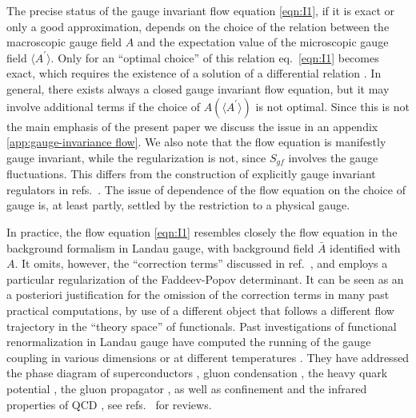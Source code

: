 \documentclass[twocolumn,aps,prd,amsmath,amssymb,preprintnumbers,longbibliography]{revtex4-1}
\numberwithin{equation}{section}
\begin{document}
The precise status of the gauge invariant flow equation \eqref{eqn:I1}, if it is exact or only a good approximation, depends on the choice of the relation between the macroscopic gauge field $A$ and the expectation value of the microscopic gauge field $\langle A^{\prime}\rangle$. Only for an ``optimal choice'' of this relation eq.~\eqref{eqn:I1} becomes exact, which requires the existence of a solution of a differential relation \cite{CWGIF}. In general, there exists always a closed gauge invariant flow equation, but it may involve additional terms if the choice of $A(\langle A^{\prime}\rangle )$ is not optimal. Since this is not the main emphasis of the present paper we discuss the issue in an appendix \ref{app:gauge-invariance flow}. We also note that the flow equation is manifestly gauge invariant, while the regularization is not, since $S_{gf}$ involves the gauge fluctuations. This differs from the construction of explicitly gauge invariant regulators in refs.~\cite{MOR1,MOR2,MOR2}. The issue of dependence of the flow equation on the choice of gauge \cite{LAV} is, at least partly, settled by the restriction to a physical gauge.

In practice, the flow equation \eqref{eqn:I1} resembles closely the flow equation in the background formalism \cite{RW} in Landau gauge, with background field $\bar{A}$ identified with $A$. It omits, however, the ``correction terms'' discussed in ref.~\cite{RW}, and employs a particular regularization of the Faddeev-Popov determinant. It can be seen as an a posteriori justification for the omission of the correction terms in many past practical computations, by use of a different object that follows a different flow trajectory in the ``theory space'' of functionals. Past investigations of functional renormalization in Landau gauge \cite{RW,R2,R3,R4} have computed the running of the gauge coupling in various dimensions \cite{RW,R3,R11,R12,R13} or at different temperatures \cite{RW,R14}. They have addressed the phase diagram of superconductors \cite{R6,R7}, gluon condensation \cite{R18,R19}, the heavy quark potential \cite{R15,R16,R17,EHW}, the gluon propagator \cite{R16,R19,R20,R23,R24,FI,CMPS1,CMPS2}, as well as confinement \cite{R21} and the infrared properties of QCD \cite{R23,R24,R25}, see refs.~\cite{R8,R9,R10} for reviews.
\end{document}
